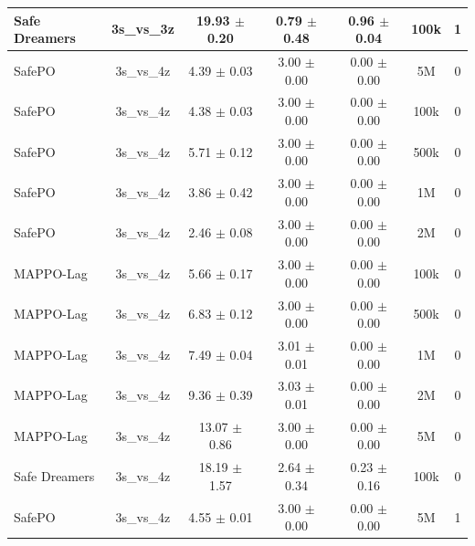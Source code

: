 \documentclass{article}
\begin{document}
\begin{longtable}{lcccccc}
Safe Dreamers & 3s\_vs\_3z & 19.93 $\pm$ 0.20 & 0.79 $\pm$ 0.48 & 0.96 $\pm$ 0.04 & 100k & 1 \\
\midrule
SafePO & 3s\_vs\_4z & \textcolor{green!60!black}{4.39 $\pm$ 0.03} & \textcolor{green!60!black}{3.00 $\pm$ 0.00} & \textcolor{green!60!black}{0.00 $\pm$ 0.00} & 5M & 0 \\
SafePO & 3s\_vs\_4z & \textcolor{green!60!black}{4.38 $\pm$ 0.03} & \textcolor{green!60!black}{3.00 $\pm$ 0.00} & \textcolor{green!60!black}{0.00 $\pm$ 0.00} & 100k & 0 \\
SafePO & 3s\_vs\_4z & \textcolor{green!60!black}{5.71 $\pm$ 0.12} & \textcolor{green!60!black}{3.00 $\pm$ 0.00} & \textcolor{green!60!black}{0.00 $\pm$ 0.00} & 500k & 0 \\
SafePO & 3s\_vs\_4z & \textcolor{green!60!black}{3.86 $\pm$ 0.42} & \textcolor{green!60!black}{3.00 $\pm$ 0.00} & \textcolor{green!60!black}{0.00 $\pm$ 0.00} & 1M & 0 \\
SafePO & 3s\_vs\_4z & \textcolor{green!60!black}{2.46 $\pm$ 0.08} & \textcolor{green!60!black}{3.00 $\pm$ 0.00} & \textcolor{green!60!black}{0.00 $\pm$ 0.00} & 2M & 0 \\
MAPPO-Lag & 3s\_vs\_4z & \textcolor{green!60!black}{5.66 $\pm$ 0.17} & \textcolor{green!60!black}{3.00 $\pm$ 0.00} & \textcolor{green!60!black}{0.00 $\pm$ 0.00} & 100k & 0 \\
MAPPO-Lag & 3s\_vs\_4z & \textcolor{green!60!black}{6.83 $\pm$ 0.12} & \textcolor{green!60!black}{3.00 $\pm$ 0.00} & \textcolor{green!60!black}{0.00 $\pm$ 0.00} & 500k & 0 \\
MAPPO-Lag & 3s\_vs\_4z & \textcolor{green!60!black}{7.49 $\pm$ 0.04} & \textcolor{green!60!black}{3.01 $\pm$ 0.01} & \textcolor{green!60!black}{0.00 $\pm$ 0.00} & 1M & 0 \\
MAPPO-Lag & 3s\_vs\_4z & \textcolor{green!60!black}{9.36 $\pm$ 0.39} & \textcolor{green!60!black}{3.03 $\pm$ 0.01} & \textcolor{green!60!black}{0.00 $\pm$ 0.00} & 2M & 0 \\
MAPPO-Lag & 3s\_vs\_4z & \textcolor{green!60!black}{13.07 $\pm$ 0.86} & \textcolor{green!60!black}{3.00 $\pm$ 0.00} & \textcolor{green!60!black}{0.00 $\pm$ 0.00} & 5M & 0 \\
Safe Dreamers & 3s\_vs\_4z & 18.19 $\pm$ 1.57 & 2.64 $\pm$ 0.34 & 0.23 $\pm$ 0.16 & 100k & 0 \\
\midrule
SafePO & 3s\_vs\_4z & \textcolor{green!60!black}{4.55 $\pm$ 0.01} & \textcolor{green!60!black}{3.00 $\pm$ 0.00} & \textcolor{green!60!black}{0.00 $\pm$ 0.00} & 5M & 1 \\

\end{longtable}
\end{document}
